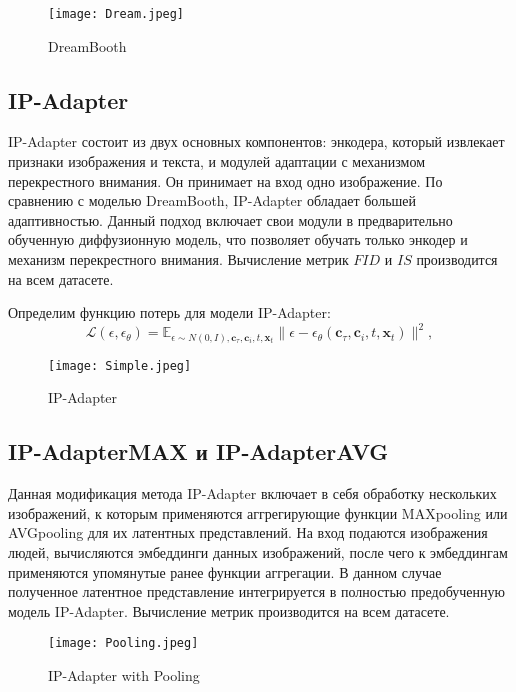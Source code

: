 \documentclass{article}
\begin{document}
\begin{figure}[H]
    \centering
    \texttt{[image: Dream.jpeg]}
    \caption{DreamBooth}
    \label{fig:simple}
\end{figure}

\subsection{IP-Adapter}
IP-Adapter состоит из двух основных компонентов: энкодера, который извлекает признаки изображения и текста, и модулей адаптации с механизмом перекрестного внимания. Он принимает на вход одно изображение. По сравнению с моделью DreamBooth, IP-Adapter обладает большей адаптивностью. Данный подход включает свои модули в предварительно обученную диффузионную модель, что позволяет обучать только энкодер и механизм перекрестного внимания. Вычисление метрик $FID$ и $IS$ производится на всем датасете. \par
Определим функцию потерь для модели IP-Adapter:
\begin{equation}
\mathcal{L}(\epsilon, \epsilon_{\theta}) = \mathbb{E}_{\epsilon \sim N(0, I),\mathbf{c}_{\tau}, \mathbf{c}_{i}, t, \mathbf{x}_{t}} \|\epsilon - \epsilon_{\theta}(\mathbf{c}_{\tau}, \mathbf{c}_{i} , t, \mathbf{x}_{t})\|^2,
\end{equation}

\begin{figure}[H]
    \centering
    \texttt{[image: Simple.jpeg]}
    \caption{IP-Adapter}
    \label{fig:simple}
\end{figure}


\subsection{IP-AdapterMAX и IP-AdapterAVG}
Данная модификация метода IP-Adapter включает в себя обработку нескольких изображений, к которым применяются аггрегирующие функции MAXpooling или AVGpooling для их латентных представлений. На вход подаются изображения людей, вычисляются эмбеддинги данных изображений, после чего к эмбеддингам применяются упомянутые ранее функции аггрегации. В данном случае полученное латентное представление интегрируется в полностью предобученную модель IP-Adapter. Вычисление метрик производится на всем датасете.

\begin{figure}[H]
    \centering
    \texttt{[image: Pooling.jpeg]}
    \caption{IP-Adapter with Pooling}
    \label{fig:pooling}
\end{figure}
\end{document}
